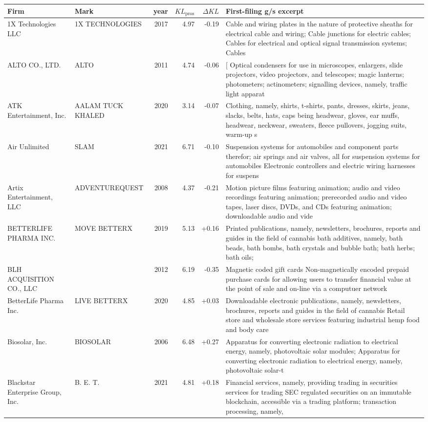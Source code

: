 \begin{tabular}{p{4.0cm}p{2.2cm}rrrp{6.5cm}}
\toprule
Firm & Mark & year & $KL_\text{pros}$ & $\Delta KL$ & First-filing g/s excerpt \\
\midrule
1X Technologies LLC & 1X TECHNOLOGIES & 2017 & 4.97 & -0.19 & Cable and wiring plates in the nature of protective sheaths for electrical cable and wiring; Cable junctions for electric cables; Cables for electrical and optical signal transmission systems; Cables  \\
ALTO CO., LTD. & ALTO & 2011 & 4.74 & -0.06 & [ Optical condensers for use in microscopes, enlargers, slide projectors, video projectors, and telescopes; magic lanterns; photometers; actinometers; signalling devices, namely, traffic light apparat \\
ATK Entertainment, Inc. & AALAM TUCK KHALED & 2020 & 3.14 & -0.07 & Clothing, namely, shirts, t-shirts, pants, dresses, skirts, jeans, slacks, belts, hats, caps being headwear, gloves, ear muffs, headwear, neckwear, sweaters, fleece pullovers, jogging suits, warm-up s \\
Air Unlimited & SLAM & 2021 & 6.71 & -0.10 & Suspension systems for automobiles and component parts therefor; air springs and air valves, all for suspension systems for automobiles Electronic controllers and electric wiring harnesses for suspens \\
Artix Entertainment, LLC & ADVENTUREQUEST & 2008 & 4.37 & -0.21 & Motion picture films featuring animation; audio and video recordings featuring animation; prerecorded audio and video tapes, laser discs, DVDs, and CDs featuring animation; downloadable audio and vide \\
BETTERLIFE PHARMA INC. & MOVE BETTERX & 2019 & 5.13 & +0.16 & Printed publications, namely, newsletters, brochures, reports and guides in the field of cannabis bath additives, namely, bath beads, bath bombs, bath crystals and bubble bath; bath herbs; bath oils;  \\
BLH ACQUISITION CO., LLC &  & 2012 & 6.19 & -0.35 & Magnetic coded gift cards Non-magnetically encoded prepaid purchase cards for allowing users to transfer financial value at the point of sale and on-line via a computuer network \\
BetterLife Pharma Inc. & LIVE BETTERX & 2020 & 4.85 & +0.03 & Downloadable electronic publications, namely, newsletters, brochures, reports and guides in the field of cannabis Retail store and wholesale store services featuring industrial hemp food and body care \\
Biosolar, Inc. & BIOSOLAR & 2006 & 6.48 & +0.27 & Apparatus for converting electronic radiation to electrical energy, namely, photovoltaic solar modules; Apparatus for converting electronic radiation to electrical energy, namely, photovoltaic solar-t \\
Blackstar Enterprise Group, Inc. & B. E. T. & 2021 & 4.81 & +0.18 & Financial services, namely, providing trading in securities services for trading SEC regulated securities on an immutable blockchain, accessible via a trading platform; transaction processing, namely, \\
\bottomrule
\end{tabular}
\clearpage

